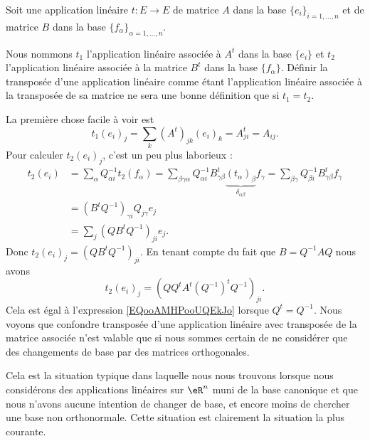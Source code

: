 Soit une application linéaire \( t\colon E\to E\) de matrice \( A\) dans la base \( \{ e_i \}_{i=1,\ldots, n}\) et de matrice \( B\) dans la base \( \{ f_{\alpha} \}_{\alpha=1,\ldots, n}\).

Nous nommons \( t_1\) l'application linéaire associée à \( A^t\) dans la base \( \{ e_i \}\) et \( t_2\) l'application linéaire associée à la matrice \( B^t\) dans la base \( \{ f_{\alpha} \}\). Définir la transposée d'une application linéaire comme étant l'application linéaire associée à la transposée de sa matrice ne sera une bonne définition que si \( t_1=t_2\).

La première chose facile à voir est
\begin{equation}        \label{EQooAMHPooUQEkJo}
    t_1(e_i)_j=\sum_k(A^t)_{jk}(e_i)_k=A^t_{ji}=A_{ij}.
\end{equation}
Pour calculer \( t_2(e_i)_j\), c'est un peu plus laborieux :
\begin{subequations}
    \begin{align}
        t_2(e_i)&=\sum_{\alpha}Q_{\alpha i}^{-1} t_2(f_\alpha)=\sum_{\beta\gamma\alpha}Q_{\alpha i}^{-1}B^t_{\gamma\beta}\underbrace{(t_{\alpha})_{\beta}}_{\delta_{\alpha\beta}}f_{\gamma}=\sum_{\beta\gamma}Q_{\beta i}^{-1}B^t_{\gamma\beta}f_{\gamma}\\
        &=(B^tQ^{-1})_{\gamma i}Q_{j\gamma}e_j\\
        &=\sum_j(QB^tQ^{-1})_{ji}e_j.
    \end{align}
\end{subequations}
Donc \( t_2(e_i)_j=(QB^tQ^{-1})_{ji}\). En tenant compte du fait que \( B=Q^{-1}AQ\) nous avons
\begin{equation}
    t_2(e_i)_j=(QQ^tA^t(Q^{-1})^tQ^{-1})_{ji}.
\end{equation}
Cela est égal à l'expression \eqref{EQooAMHPooUQEkJo} lorsque \( Q^t=Q^{-1}\). Nous voyons que confondre transposée d'une application linéaire avec transposée de la matrice associée n'est valable que si nous sommes certain de ne considérer que des changements de base par des matrices orthogonales.

Cela est la situation typique dans laquelle nous nous trouvons lorsque nous considérons des applications linéaires sur \( \eR^n\) muni de la base canonique et que nous n'avons aucune intention de changer de base, et encore moins de chercher une base non orthonormale. Cette situation est clairement la situation la plus courante.

